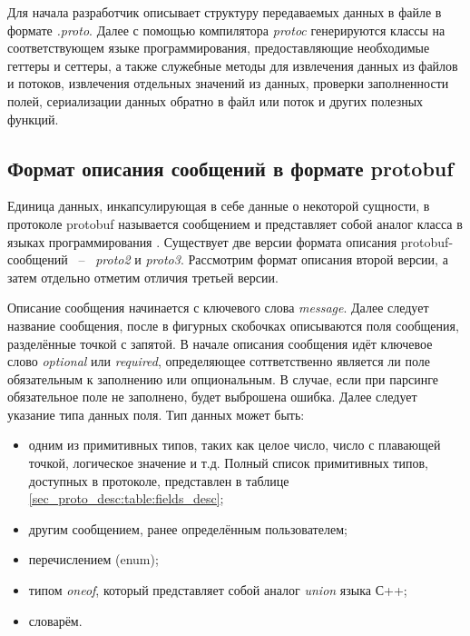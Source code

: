 Для начала разработчик описывает структуру передаваемых данных в файле в формате \textit{.proto}. 
Далее с помощью компилятора \textit{protoc} генерируются классы на соответствующем языке программирования, предоставляющие необходимые геттеры и сеттеры,
а также служебные методы для извлечения данных из файлов и потоков, извлечения отдельных значений из данных, 
проверки заполненности полей, сериализации данных обратно в файл или поток и других полезных функций.

\subsection{Формат описания сообщений в формате protobuf}

Единица данных, инкапсулирующая в себе данные о некоторой сущности, в протоколе protobuf называется 
сообщением и представляет собой аналог класса в языках программирования \cite{protobuf_api}.
Существует две версии формата описания protobuf-сообщений ~--~ \textit{proto2} и \textit{proto3}. Рассмотрим формат описания второй версии, а затем отдельно отметим отличия третьей версии.

Описание сообщения начинается с ключевого слова \textit{message}. Далее следует название сообщения, после в фигурных скобочках описываются поля сообщения, разделённые точкой с запятой.
В начале описания сообщения идёт ключевое слово \textit{optional} или \textit{required}, определяющее соттветственно является ли поле обязательным к заполнению или опциональным. В случае, если при парсинге обязательное поле не заполнено, будет выброшена ошибка. Далее следует указание типа данных поля. Тип данных может быть:
\begin{itemize}
    \item одним из примитивных типов, таких как целое число, число с плавающей точкой, логическое значение и т.д. Полный список примитивных типов, доступных в протоколе, представлен в таблице \ref{sec_proto_desc:table:fields_desc};
    \item другим сообщением, ранее определённым пользователем;
    \item перечислением (enum);
    \item типом \textit{oneof}, который представляет собой аналог \textit{union} языка С++;
    \item словарём.
\end{itemize}

